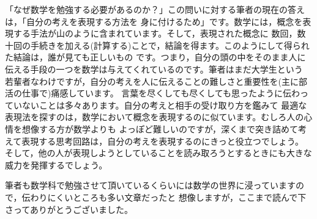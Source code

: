 \documentclass[./main]{subfiles}
\begin{document}
「なぜ数学を勉強する必要があるのか？」この問いに対する筆者の現在の答えは，「自分の考えを表現する方法を
身に付けるため」です。数学には，概念を表現する手法が山のように含まれています。そして，表現された概念に
数回，数十回の手続きを加える(計算する)ことで，結論を得ます。このようにして得られた結論は，誰が見ても正しいもの
です。つまり，自分の頭の中をそのまま人に伝える手段の一つを数学は与えてくれているのです。筆者はまだ大学生という
若輩者なわけですが，自分の考えを人に伝えることの難しさと重要性を(主に部活の仕事で)痛感しています。
言葉を尽くしても尽くしても思ったように伝わっていないことは多々あります。自分の考えと相手の受け取り方を鑑みて
最適な表現法を探すのは，数学において概念を表現するのに似ています。むしろ人の心情を想像する方が数学よりも
よっぽど難しいのですが，深くまで突き詰めて考えて表現する思考回路は，自分の考えを表現するのにきっと役立つでしょう。
そして，他の人が表現しようとしていることを読み取ろうとするときにも大きな威力を発揮するでしょう。

筆者も数学科で勉強させて頂いているくらいには数学の世界に浸っていますので，伝わりにくいところも多い文章だったと
想像しますが，ここまで読んで下さってありがとうございました。
\end{document}
